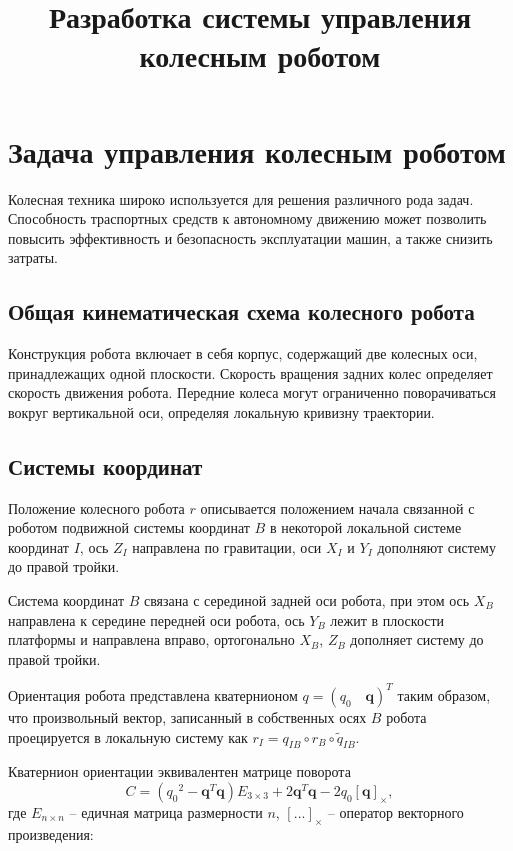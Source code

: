 \documentclass[a4paper,12pt]{article}
\title{Разработка системы управления колесным роботом}
\author{}
\begin{document}
\maketitle

\section{Задача управления колесным роботом}	

Колесная техника широко используется для решения различного рода задач. Способность траспортных средств к автономному движению может позволить повысить эффективность и безопасность эксплуатации машин, а также снизить затраты.

\subsection{Общая кинематическая схема колесного робота}

Конструкция робота включает в себя корпус, содержащий две колесных оси, принадлежащих одной плоскости. Скорость вращения задних колес определяет скорость движения робота. Передние колеса могут ограниченно поворачиваться вокруг вертикальной оси, определяя локальную кривизну траектории.


\subsection{Системы координат}

Положение колесного робота $r$ описывается положением начала связанной с роботом подвижной системы координат $B$ в некоторой локальной системе координат $I$, ось $Z_I$ направлена по гравитации, оси $X_I$ и $Y_I$ дополняют систему до правой тройки.

Система координат $B$ связана с серединой задней оси робота, при этом  ось $X_B$ направлена к середине передней оси робота, ось $Y_B$ лежит в плоскости платформы и направлена вправо, ортогонально $X_B$, $Z_B$ дополняет систему до правой тройки.

Ориентация робота представлена кватернионом $q = (q_0 \quad \textbf{q})^T$ таким образом, что произвольный вектор, записанный в собственных осях $B$ робота проецируется в локальную систему как
$r_I = q_{IB} \circ r_B \circ \tilde{q}_{IB}$.

Кватернион ориентации эквивалентен матрице поворота
\begin{equation} \label{eq:quat_to_rotmx}
C = ({q_0}^2 -  \textbf{q}^T  \textbf{q}) E_{3 \times 3} + 2  \textbf{q}^T  \textbf{q} - 2 {q_0} [ \textbf{q}]_{\times},
\end{equation}
где $E_{n \times n}$ -- едичная матрица размерности $n$, $[...]_{\times}$ -- оператор векторного произведения:
\end{document}
